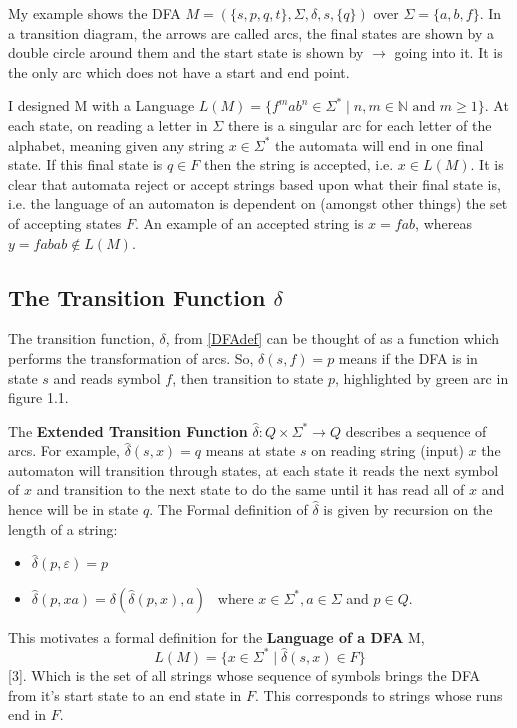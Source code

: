 \documentclass[a4paper,12pt]{report}
\theoremstyle{definition}
\begin{document}
My example shows the DFA
$M=(\{s,p,q,t\},\Sigma,\delta,s,\{q\})$ over $\Sigma=\{a,b,f\}$. In a transition diagram, the arrows are called arcs, the final states are shown by a double circle around them and the start state is shown by $\rightarrow$ going into it. It is the only arc which does not have a start and end point.  

I designed M with a Language $L(M) = \{f^mab^n \in \Sigma^* \mid n,m \in \mathbb{N} \text{ and } m \geq 1\}$.
At each state, on reading a letter in $ \Sigma$
there is a singular arc for each letter of the alphabet, meaning given any string $x\in\Sigma^*$ the automata will end in one final state. If this final state is $q\in F$ then the string is accepted, i.e.  $x\in L(M)$.  It is clear that automata reject or accept strings based upon what their final state is, i.e. the language of an automaton is dependent on (amongst other things) the set of accepting states $F$. An example of an accepted string is $x=fab$, whereas $y=fabab \notin L(M) $.

\subsection{The Transition Function $\delta$}
\label{delta}
The transition function, $\delta$, from \ref{DFAdef} can be thought of as a function which performs the transformation of arcs. So, 
$\delta(s,f)=p$ means if the DFA is in state $s$ and reads symbol $f$, then transition to state $p$, highlighted by green arc in figure 1.1.

The \textbf{Extended Transition Function}
$\hat{\delta}: Q\times \Sigma^* \rightarrow Q$ describes a sequence of arcs. For example, $\hat{\delta}(s,x)=q$  means at state $s$ on reading string (input) $x$ the automaton will transition through states, at each state it reads the next symbol of $x$ and transition to the next state to do the same until it has read all of $x$ and hence will be in state $q$. The Formal definition of $\hat{\delta}$ is given by recursion on the length of a string:
\begin{itemize}
    \item[]$ \hat{\delta}(p,\varepsilon)=p$
    \item[]$ \hat{\delta}(p,xa)=\delta(\hat{\delta}(p,x),a)$ \thinspace \ where $x\in\Sigma^*, a\in\Sigma$ and $p\in Q$. 
\end{itemize}

This motivates a formal definition for the \textbf{Language of a DFA} M, $$L(M)=\{x\in\Sigma^*\mid\hat{\delta}(s,x)\in F\}$$ [3]. Which is the set of all strings whose sequence of symbols brings the DFA from it's start state to an end state in $F$. This corresponds to strings whose runs end in $F$.  
\end{document}
